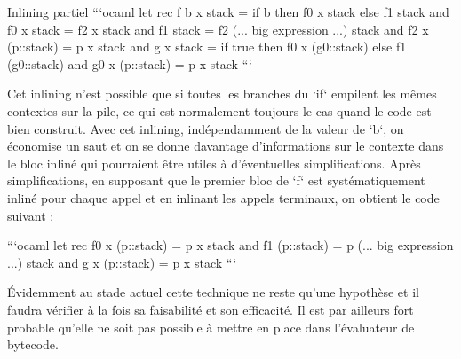 \documentclass{beamer}
\begin{document}
\begin{frame}{Inlining partiel}
    ```ocaml
    let rec f b x stack =
      if b then f0 x stack else f1 stack
    and f0 x stack =
      f2 x stack
    and f1 stack =
      f2 (... big expression ...) stack
    and f2 x (p::stack) =
      p x stack
    and g x stack =
      if true then f0 x (g0::stack) else f1 (g0::stack)
    and g0 x (p::stack) =
      p x stack
    ```
    
    Cet inlining n'est possible que si toutes les branches du `if` empilent les mêmes contextes sur la pile, ce qui est normalement toujours le cas quand le code est bien construit. Avec cet inlining, indépendamment de la valeur de `b`, on économise un saut et on se donne davantage d'informations sur le contexte dans le bloc inliné qui pourraient être utiles à d'éventuelles simplifications. Après simplifications, en supposant que le premier bloc de `f` est systématiquement inliné pour chaque appel et en inlinant les appels terminaux, on obtient le code suivant :
    
    ```ocaml
    let rec f0 x (p::stack) =
      p x stack
    and f1 (p::stack) =
      p (... big expression ...) stack
    and g x (p::stack) =
      p x stack
    ```
    
    Évidemment au stade actuel cette technique ne reste qu'une hypothèse et il faudra vérifier à la fois sa faisabilité et son efficacité. Il est par ailleurs fort probable qu'elle ne soit pas possible à mettre en place dans l'évaluateur de bytecode.
\end{frame}

\fi
\end{document}
